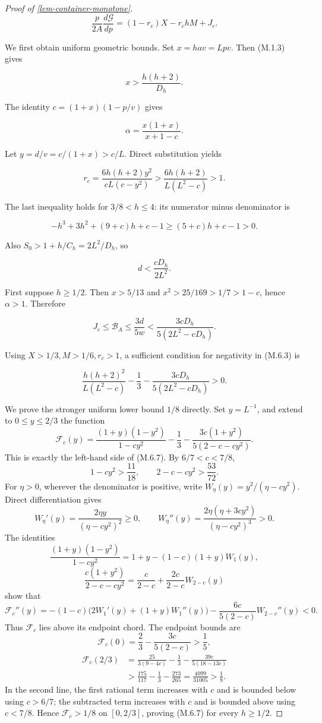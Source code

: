 \documentclass[11pt,a4paper]{article}
\theoremstyle{proofmanuscript}
\begin{document}
\begin{proof}[Proof of \ref{lem-container-monotone}]
\[
\frac p{2A}\frac{d\mathcal G}{dp}
=(1-r_c)X-r_chM+J_c.                                     \tag{M.6.3}
\]

We first obtain uniform geometric bounds. Set \(x=hav=Lp v\). Then (M.1.3) gives

\[
x>\frac{h(h+2)}{D_h}.
\]

The identity \(c=(1+x)(1-p/v)\) gives

\[
\alpha=\frac{x(1+x)}{x+1-c}.                              \tag{M.6.4}
\]

Let \(y=d/v=c/(1+x)>c/L\). Direct substitution yields

\[
r_c=\frac{6h(h+2)y^2}{cL(c-y^2)}
>\frac{6h(h+2)}{L(L^2-c)}>1.                             \tag{M.6.5}
\]

The last inequality holds for \(3/8<h\le4\): its numerator minus denominator is

\[
-h^3+3h^2+(9+c)h+c-1
\ge(5+c)h+c-1>0.
\]

Also \(S_0>1+h/C_h=2L^2/D_h\), so

\[
d<\frac{cD_h}{2L^2}.                                    \tag{M.6.6}
\]

First suppose \(h\ge1/2\). Then \(x>5/13\) and \(x^2>25/169>1/7>1-c\), hence \(\alpha>1\). Therefore

\[
J_c\le\mathcal B_A\le\frac{3d}{5w}
<\frac{3cD_h}{5(2L^2-cD_h)}.
\]

Using \(X>1/3,M>1/6,r_c>1\), a sufficient condition for negativity in (M.6.3) is

\[
\frac{h(h+2)^2}{L(L^2-c)}
-\frac13-\frac{3cD_h}{5(2L^2-cD_h)}>0.                    \tag{M.6.7}
\]

We prove the stronger uniform lower bound \(1/8\) directly. Set \(y=L^{-1}\), and extend to \(0\le y\le2/3\) the function \[
\mathcal F_c(y)=
\frac{(1+y)(1-y^2)}{1-cy^2}
-\frac13-\frac{3c(1+y^2)}{5(2-c-cy^2)}.
\] This is exactly the left-hand side of (M.6.7). By \(6/7<c<7/8\), \[
1-cy^2>\frac{11}{18},\qquad
2-c-cy^2>\frac{53}{72}.
\] For \(\eta>0\), wherever the denominator is positive, write \(W_\eta(y)=y^2/(\eta-cy^2)\). Direct differentiation gives \[
W_\eta'(y)=\frac{2\eta y}{(\eta-cy^2)^2}\ge0,\qquad
W_\eta''(y)=\frac{2\eta(\eta+3cy^2)}{(\eta-cy^2)^3}>0.
\] The identities \[
\frac{(1+y)(1-y^2)}{1-cy^2}
=1+y-(1-c)(1+y)W_1(y),
\] \[
\frac{c(1+y^2)}{2-c-cy^2}
=\frac{c}{2-c}+\frac{2c}{2-c}W_{2-c}(y)
\] show that \[
\mathcal F_c''(y)
=-(1-c)\bigl(2W_1'(y)+(1+y)W_1''(y)\bigr)
-\frac{6c}{5(2-c)}W_{2-c}''(y)<0.
\] Thus \(\mathcal F_c\) lies above its endpoint chord. The endpoint bounds are \[
\mathcal F_c(0)=\frac23-\frac{3c}{5(2-c)}
>\frac15,
\] \[
\begin{aligned}
\mathcal F_c(2/3)
&=\frac{25}{3(9-4c)}-\frac13-\frac{39c}{5(18-13c)}\\
&>\frac{175}{117}-\frac13-\frac{273}{265}
=\frac{4099}{31005}>\frac18.
\end{aligned}
\] In the second line, the first rational term increases with \(c\) and is bounded below using \(c>6/7\); the subtracted term increases with \(c\) and is bounded above using \(c<7/8\). Hence \(\mathcal F_c>1/8\) on \([0,2/3]\), proving (M.6.7) for every \(h\ge1/2\).


\end{proof}
\end{document}
